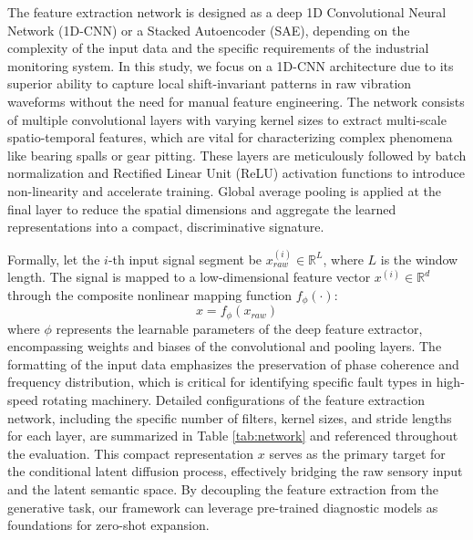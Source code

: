 The feature extraction network is designed as a deep 1D Convolutional Neural Network (1D-CNN) or a Stacked Autoencoder (SAE), depending on the complexity of the input data and the specific requirements of the industrial monitoring system. In this study, we focus on a 1D-CNN architecture due to its superior ability to capture local shift-invariant patterns in raw vibration waveforms without the need for manual feature engineering. The network consists of multiple convolutional layers with varying kernel sizes to extract multi-scale spatio-temporal features, which are vital for characterizing complex phenomena like bearing spalls or gear pitting. These layers are meticulously followed by batch normalization and Rectified Linear Unit (ReLU) activation functions to introduce non-linearity and accelerate training. Global average pooling is applied at the final layer to reduce the spatial dimensions and aggregate the learned representations into a compact, discriminative signature.

Formally, let the $i$-th input signal segment be $x_{raw}^{(i)} \in \mathbb{R}^L$, where $L$ is the window length. The signal is mapped to a low-dimensional feature vector $x^{(i)} \in \mathbb{R}^d$ through the composite nonlinear mapping function $f_{\phi}(\cdot)$:
\begin{equation}
x = f_{\phi}(x_{raw})
\end{equation}
where $\phi$ represents the learnable parameters of the deep feature extractor, encompassing weights and biases of the convolutional and pooling layers. The formatting of the input data emphasizes the preservation of phase coherence and frequency distribution, which is critical for identifying specific fault types in high-speed rotating machinery. Detailed configurations of the feature extraction network, including the specific number of filters, kernel sizes, and stride lengths for each layer, are summarized in Table \ref{tab:network} and referenced throughout the evaluation. This compact representation $x$ serves as the primary target for the conditional latent diffusion process, effectively bridging the raw sensory input and the latent semantic space. By decoupling the feature extraction from the generative task, our framework can leverage pre-trained diagnostic models as foundations for zero-shot expansion.

